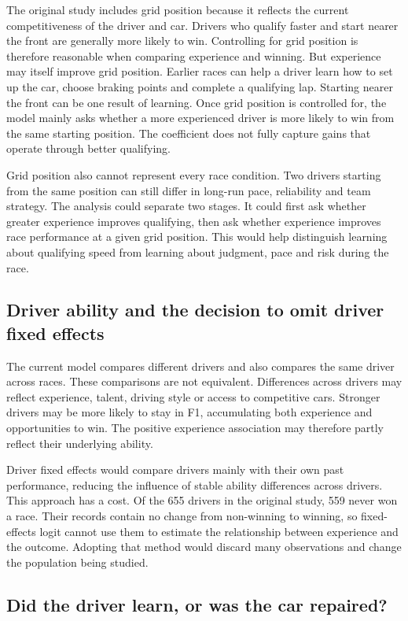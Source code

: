 \documentclass[11pt,letterpaper]{article}
\begin{document}
The original study includes grid position because it reflects the current competitiveness of the driver and car. Drivers who qualify faster and start nearer the front are generally more likely to win. Controlling for grid position is therefore reasonable when comparing experience and winning. But experience may itself improve grid position. Earlier races can help a driver learn how to set up the car, choose braking points and complete a qualifying lap. Starting nearer the front can be one result of learning. Once grid position is controlled for, the model mainly asks whether a more experienced driver is more likely to win from the same starting position. The coefficient does not fully capture gains that operate through better qualifying.

Grid position also cannot represent every race condition. Two drivers starting from the same position can still differ in long-run pace, reliability and team strategy. The analysis could separate two stages. It could first ask whether greater experience improves qualifying, then ask whether experience improves race performance at a given grid position. This would help distinguish learning about qualifying speed from learning about judgment, pace and risk during the race.

\subsection*{Driver ability and the decision to omit driver fixed effects}

The current model compares different drivers and also compares the same driver across races. These comparisons are not equivalent. Differences across drivers may reflect experience, talent, driving style or access to competitive cars. Stronger drivers may be more likely to stay in F1, accumulating both experience and opportunities to win. The positive experience association may therefore partly reflect their underlying ability.

Driver fixed effects would compare drivers mainly with their own past performance, reducing the influence of stable ability differences across drivers. This approach has a cost. Of the 655 drivers in the original study, 559 never won a race. Their records contain no change from non-winning to winning, so fixed-effects logit cannot use them to estimate the relationship between experience and the outcome. Adopting that method would discard many observations and change the population being studied.

\subsection*{Did the driver learn, or was the car repaired?}
\end{document}
